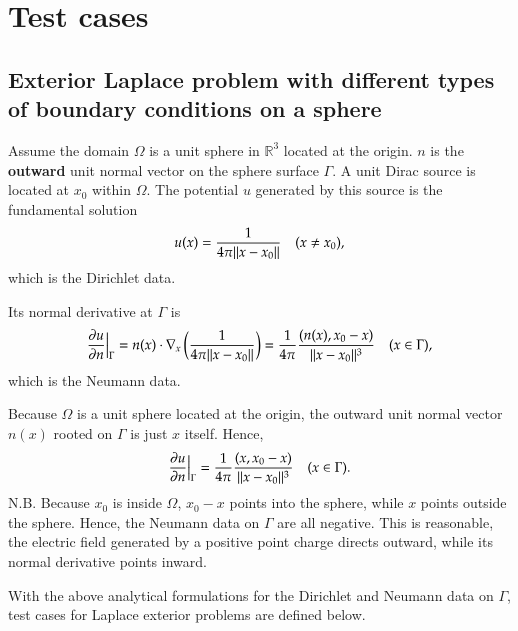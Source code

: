 \documentclass[11pt, a4paper]{book}
\begin{document}
\chapter{Test cases}

\section{Exterior Laplace problem with different types of boundary conditions on a
  sphere}
\label{sec:testcase-exterior-laplace}

Assume the domain $\Omega$ is a unit sphere in $\mathbb{R}^3$ located at the origin. $n$ is the
\textbf{outward} unit normal vector on the sphere surface $\Gamma$. A unit Dirac source is
located at $x_0$ within $\Omega$. The potential $u$ generated by this source is the
fundamental solution
\begin{equation}
  u(x) = \frac{1}{4\pi\lVert x-x_0\rVert} \quad (x\neq x_0),
\end{equation}
which is the Dirichlet data.

Its normal derivative at $\Gamma$ is
\begin{equation}
  \frac{\partial u}{\partial n}\Big\vert_{\Gamma} = n(x)\cdot\nabla_x
  \left( \frac{1}{4\pi\lVert x-x_0\rVert} \right) = \frac{1}{4\pi}\frac{(n(x),
    x_0-x)}{\lVert x-x_0\rVert^3} \quad (x\in\Gamma),
\end{equation}
which is the Neumann data.

Because $\Omega$ is a unit sphere located at the origin, the outward unit normal vector
$n(x)$ rooted on $\Gamma$ is just $x$ itself. Hence,
\begin{equation}
  \frac{\partial u}{\partial n}\Big\vert_{\Gamma} = \frac{1}{4\pi}\frac{(x,
    x_0-x)}{\lVert x-x_0\rVert^3} \quad (x\in\Gamma).
\end{equation}
N.B. Because $x_0$ is inside $\Omega$, $x_0-x$ points into the sphere, while $x$ points
outside the sphere. Hence, the Neumann data on $\Gamma$ are all negative. This is
reasonable, the electric field generated by a positive point charge directs outward, while
its normal derivative points inward.

With the above analytical formulations for the Dirichlet and Neumann data on $\Gamma$,
test cases for Laplace exterior problems are defined below.
\end{document}
